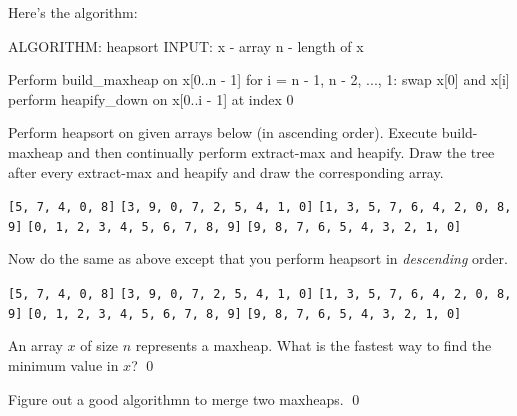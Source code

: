 Here's the algorithm:
\begin{console}
ALGORITHM: heapsort
INPUT:     x - array
           n - length of x

Perform build_maxheap on x[0..n - 1]
for i = n - 1, n - 2, ..., 1: 
    swap x[0] and x[i]
    perform heapify_down on x[0..i - 1] at index 0
\end{console}

\newpage
\begin{ex}
Perform heapsort on given arrays below (in ascending order).
Execute build-maxheap and then continually perform
extract-max and heapify.
Draw the tree after every extract-max and heapify and draw the
corresponding array.
\begin{tightlist}
  \li \verb![5, 7, 4, 0, 8]!
  \li \verb![3, 9, 0, 7, 2, 5, 4, 1, 0]!
  \li \verb![1, 3, 5, 7, 6, 4, 2, 0, 8, 9]!
  \li \verb![0, 1, 2, 3, 4, 5, 6, 7, 8, 9]!
  \li \verb![9, 8, 7, 6, 5, 4, 3, 2, 1, 0]!
\end{tightlist}
\end{ex}

\newpage
\begin{ex}
  Now do the same as above
  except that you perform heapsort in \textit{descending} order.
\begin{tightlist}
  \li \verb![5, 7, 4, 0, 8]!
  \li \verb![3, 9, 0, 7, 2, 5, 4, 1, 0]!
  \li \verb![1, 3, 5, 7, 6, 4, 2, 0, 8, 9]!
  \li \verb![0, 1, 2, 3, 4, 5, 6, 7, 8, 9]!
  \li \verb![9, 8, 7, 6, 5, 4, 3, 2, 1, 0]!
\end{tightlist}
\end{ex}


\newpage
\begin{ex}
An array $x$ of size $n$ represents a maxheap.
What is the fastest way to find the minimum value in $x$?
\qed
\end{ex}


\newpage
\begin{ex}
Figure out a good algorithmn to merge two maxheaps.
\qed
\end{ex}


